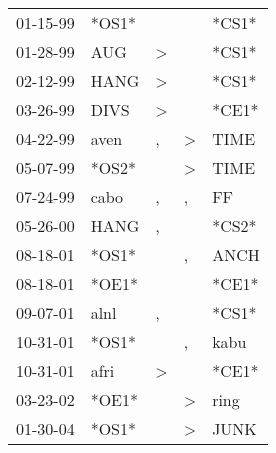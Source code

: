 \begin{supertabular}{p{0.07\textwidth}p{0.06\textwidth}p{0.02\textwidth}p{0.02\textwidth}p{0.06\textwidth}}
 01-15-99\textsuperscript{} &                            *OS1* &               &               &                   *CS1* \\
 01-28-99\textsuperscript{} &            AUG\textsuperscript{} &  \textgreater &               &                   *CS1* \\
 02-12-99\textsuperscript{} &           HANG\textsuperscript{} &  \textgreater &               &                   *CS1* \\
 03-26-99\textsuperscript{} &           DIVS\textsuperscript{} &  \textgreater &               &                   *CE1* \\
 04-22-99\textsuperscript{} &           aven\textsuperscript{} &             , &  \textgreater &  TIME\textsuperscript{} \\
 05-07-99\textsuperscript{} &                            *OS2* &               &  \textgreater &  TIME\textsuperscript{} \\
 07-24-99\textsuperscript{} &           cabo\textsuperscript{} &             , &             , &    FF\textsuperscript{} \\
 05-26-00\textsuperscript{} &           HANG\textsuperscript{} &             , &               &                   *CS2* \\
 08-18-01\textsuperscript{} &                            *OS1* &               &             , &  ANCH\textsuperscript{} \\
 08-18-01\textsuperscript{} &                            *OE1* &               &               &                   *CE1* \\
 09-07-01\textsuperscript{} &           alnl\textsuperscript{} &             , &               &                   *CS1* \\
 10-31-01\textsuperscript{} &                            *OS1* &               &             , &  kabu\textsuperscript{} \\
 10-31-01\textsuperscript{} &           afri\textsuperscript{} &  \textgreater &               &                   *CE1* \\
 03-23-02\textsuperscript{} &                            *OE1* &               &  \textgreater &  ring\textsuperscript{} \\
 01-30-04\textsuperscript{} &                            *OS1* &               &  \textgreater &  JUNK\textsuperscript{} \\

\end{supertabular}
